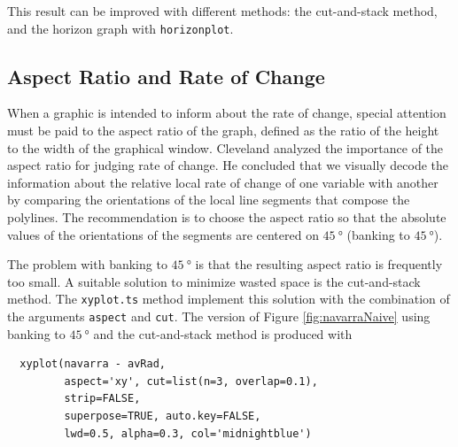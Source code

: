 \documentclass[smallroyalvopaper]{memoir}
\begin{document}
This result can be improved with different methods: the cut-and-stack
method, and the horizon graph with \texttt{horizonplot}.

\subsection{Aspect Ratio and Rate of Change}
\label{sec:orgc403e46}
When a graphic is intended to inform about the rate of change,
special attention must be paid to the aspect ratio of the graph,
defined as the ratio of the height to the width of the graphical
window. Cleveland analyzed the importance of the aspect ratio for
judging rate of change. He concluded that we visually decode the
information about the relative local rate of change of one
variable with another by comparing the orientations of the local
line segments that compose the polylines. The recommendation is to
choose the aspect ratio so that the absolute values of the
orientations of the segments are centered on \(\SI{45}{\degree}\) (banking
to \(\SI{45}{\degree}\)). 

The problem with banking to \(\SI{45}{\degree}\) is that the resulting
aspect ratio is frequently too small. A suitable solution to
minimize wasted space is the cut-and-stack method. The \texttt{xyplot.ts}
method implement this solution with the combination of the
arguments \texttt{aspect} and \texttt{cut}. The version of Figure
\ref{fig:navarraNaive} using banking to \(\SI{45}{\degree}\) and the
cut-and-stack method is produced with
\lstset{language=r,label= ,caption= ,captionpos=b,numbers=none}
\begin{lstlisting}
  xyplot(navarra - avRad,
         aspect='xy', cut=list(n=3, overlap=0.1),
         strip=FALSE,
         superpose=TRUE, auto.key=FALSE,
         lwd=0.5, alpha=0.3, col='midnightblue')
\end{lstlisting}
\end{document}
